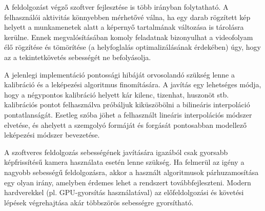 \bigskip

A feldolgozást végző szoftver fejlesztése is több irányban folytatható. A felhasználói aktivitás könnyebben mérhetővé válna, ha egy darab rögzített kép helyett a munkamenetek alatt a képernyő tartalmának változása is tárolásra kerülne. Ennek megvalósításában komoly feladatnak bizonyulhat a videofolyam élő rögzítése és tömörítése (a helyfoglalás optimalizálásának érdekében) úgy, hogy az a tekintetkövetés sebességét ne befolyásolja.

A jelenlegi implementáció pontossági hibáját orvosolandó szükség lenne a kalibráció és a leképezési algoritmus finomítására. A javítás egy lehetséges módja, hogy a négypontos kalibráció helyett kár kilenc, tizenhat, huszonöt stb. kalibrációs pontot felhasználva próbáljuk kiküszöbölni a bilineáris interpoláció pontatlanságát. Esetleg szóba jöhet a felhasznált lineáris interpolációs módszer elvetése, és ahelyett a szemgolyó formáját és forgását pontosabban modellező leképezési módszer bevezetése.

A szoftveres feldolgozás sebességének javítására igazából csak gyorsabb képfrissítésű kamera használata esetén lenne szükség. Ha felmerül az igény a nagyobb sebességű feldolgozásra, akkor a használt algoritmusok párhuzamosítása egy olyan irány, amelyben érdemes lehet a rendszert továbbfejleszteni. Modern hardverekkel (pl. GPU-gyorsítás használatával) az előfeldolgozási és követési lépések végrehajtása akár többszörös sebességre gyorsítható.